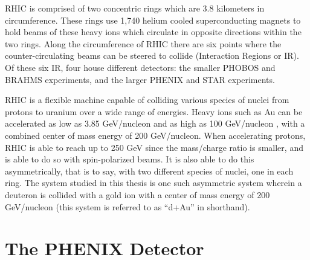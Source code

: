 RHIC is comprised of two concentric rings which are 3.8 kilometers in circumference.  These rings use 1,740 helium cooled superconducting magnets to hold beams of these heavy ions which circulate in opposite directions within the two rings.  Along the circumference of RHIC there are six points where the counter-circulating beams can be steered to collide (Interaction Regions or IR). Of these six IR, four house different detectors: the smaller PHOBOS and BRAHMS experiments, and the larger PHENIX and STAR experiments.  

RHIC is a flexible machine capable of colliding various species of nuclei from protons to uranium \citep{EBISupgrade} over a wide range of energies.  Heavy ions such as Au can be accelerated as low as 3.85 GeV/nucleon and as high as 100 GeV/nucleon \citep{RHIClum}, with a combined center of mass energy of 200 GeV/nucleon.  When accelerating protons, RHIC is able to reach up to 250 GeV since the mass/charge ratio is smaller, and is able to do so with spin-polarized beams. It is also able to do this asymmetrically, that is to say, with two different species of nuclei, one in each ring.  The system studied in this thesis is one such asymmetric system wherein a deuteron is collided with a gold ion with a center of mass energy of 200 GeV/nucleon (this system is referred to as ``d+Au'' in shorthand).

\section{The PHENIX Detector}


